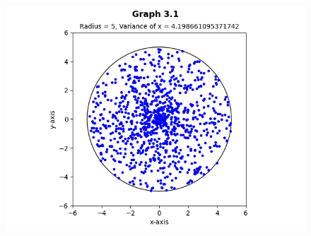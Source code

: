 \documentclass[answers]{exam}
\begin{document}


\begin{figure}[h]
  \centering
  \includegraphics[scale=0.7]{Q3/Q3(1).png}
\end{figure}
\newpage
\end{document}
